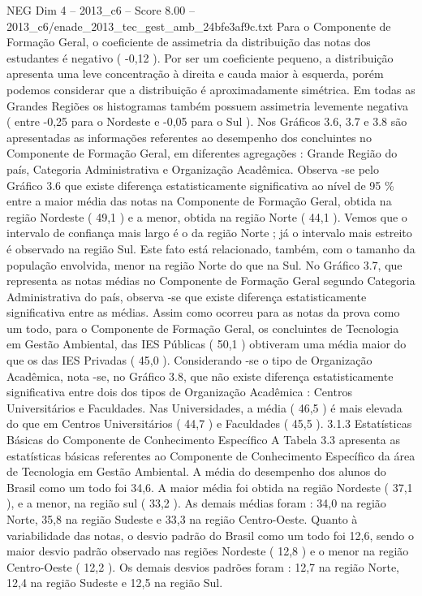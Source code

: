\begin{textsample}{NEG Dim 4 – 2013\_c6 – Score 8.00 – 2013\_c6/enade\_2013\_tec\_gest\_amb\_24bfe3af9c.txt}
Para o Componente de Formação Geral, o coeficiente de assimetria da distribuição das notas dos estudantes é negativo ( -0,12 ).
Por ser um coeficiente pequeno, a distribuição apresenta uma leve concentração à direita e cauda maior à esquerda, porém podemos considerar que a distribuição é aproximadamente simétrica.
Em todas as Grandes Regiões os histogramas também possuem assimetria levemente negativa ( entre -0,25 para o Nordeste e -0,05 para o Sul ).
Nos Gráficos 3.6, 3.7 e 3.8 são apresentadas as informações referentes ao desempenho dos concluintes no Componente de Formação Geral, em diferentes agregações : Grande Região do país, Categoria Administrativa e Organização Acadêmica.
Observa -se pelo Gráfico 3.6 que existe diferença estatisticamente significativa ao nível de 95 \% entre a maior média das notas na Componente de Formação Geral, obtida na região Nordeste ( 49,1 ) e a menor, obtida na região Norte ( 44,1 ).
Vemos que o intervalo de confiança mais largo é o da região Norte ; já o intervalo mais estreito é observado na região Sul.
Este fato está relacionado, também, com o tamanho da população envolvida, menor na região Norte do que na Sul.
No Gráfico 3.7, que representa as notas médias no Componente de Formação Geral segundo Categoria Administrativa do país, observa -se que existe diferença estatisticamente significativa entre as médias.
Assim como ocorreu para as notas da prova como um todo, para o Componente de Formação Geral, os concluintes de Tecnologia em Gestão Ambiental, das IES Públicas ( 50,1 ) obtiveram uma média maior do que os das IES Privadas ( 45,0 ).
Considerando -se o tipo de Organização Acadêmica, nota -se, no Gráfico 3.8, que não existe diferença estatisticamente significativa entre dois dos tipos de Organização Acadêmica : Centros Universitários e Faculdades.
Nas Universidades, a média ( 46,5 ) é mais elevada do que em Centros Universitários ( 44,7 ) e Faculdades ( 45,5 ). 3.1.3 Estatísticas Básicas do Componente de Conhecimento Específico A Tabela 3.3 apresenta as estatísticas básicas referentes ao Componente de Conhecimento Específico da área de Tecnologia em Gestão Ambiental.
A média do desempenho dos alunos do Brasil como um todo foi 34,6.
A maior média foi obtida na região Nordeste ( 37,1 ), e a menor, na região sul ( 33,2 ).
As demais médias foram : 34,0 na região Norte, 35,8 na região Sudeste e 33,3 na região Centro-Oeste.
Quanto à variabilidade das notas, o desvio padrão do Brasil como um todo foi 12,6, sendo o maior desvio padrão observado nas regiões Nordeste ( 12,8 ) e o menor na região Centro-Oeste ( 12,2 ).
Os demais desvios padrões foram : 12,7 na região Norte, 12,4 na região Sudeste e 12,5 na região Sul.

\end{textsample}
